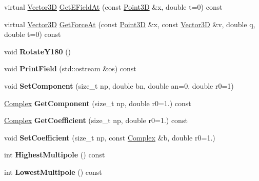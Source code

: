 \begin{DoxyCompactItemize}
\item 
virtual \hyperlink{classTVec3D}{Vector3D} \hyperlink{classMultipoleField_a73c52e27189c14b69d6cae9e1bb8bad0}{Get\+E\+Field\+At} (const \hyperlink{classTVec3D}{Point3D} \&x, double t=0) const
\item 
virtual \hyperlink{classTVec3D}{Vector3D} \hyperlink{classMultipoleField_a0f0e87ad80978757fd7f14a37086162b}{Get\+Force\+At} (const \hyperlink{classTVec3D}{Point3D} \&x, const \hyperlink{classTVec3D}{Vector3D} \&v, double q, double t=0) const
\item 
\mbox{\label{classMultipoleField_a58fae7fe3a2975e18c4c4135079fc01c}} 
void {\bfseries Rotate\+Y180} ()
\item 
\mbox{\label{classMultipoleField_a0c95d4aef124a22a4635288bcc47f91e}} 
void {\bfseries Print\+Field} (std\+::ostream \&os) const
\item 
\mbox{\label{classMultipoleField_a95302032bb2cfc3c0cf915acad03a624}} 
void {\bfseries Set\+Component} (size\+\_\+t np, double bn, double an=0, double r0=1)
\item 
\mbox{\label{classMultipoleField_a250ed03746b63efc6fd37169c08c3428}} 
\hyperlink{classComplex}{Complex} {\bfseries Get\+Component} (size\+\_\+t np, double r0=1.) const
\item 
\mbox{\label{classMultipoleField_a539db24f08e3a4dd12c40989c89ad4ae}} 
\hyperlink{classComplex}{Complex} {\bfseries Get\+Coefficient} (size\+\_\+t np, double r0=1.) const
\item 
\mbox{\label{classMultipoleField_a3c8f1c58af549fe46d72c29904ca953c}} 
void {\bfseries Set\+Coefficient} (size\+\_\+t np, const \hyperlink{classComplex}{Complex} \&b, double r0=1.)
\item 
\mbox{\label{classMultipoleField_a8fd784edb87e9192399437fcdd935111}} 
int {\bfseries Highest\+Multipole} () const
\item 
\mbox{\label{classMultipoleField_a19054618212550ba26847a6f7c294b7e}} 
int {\bfseries Lowest\+Multipole} () const
\end{DoxyCompactItemize}


